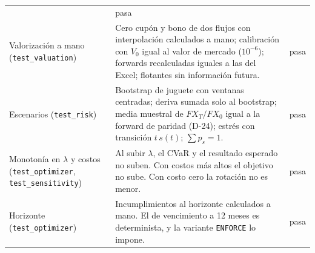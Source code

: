 \begin{table}[htbp]
\begin{tabular}{p{}p{}l}
  & pasa \\
Valorización a mano (\texttt{test\_valuation})
  & Cero cupón y bono de dos flujos con interpolación calculados a mano; calibración con $V_0$ igual al
    valor de mercado ($10^{-6}$); forwards recalculadas iguales a las del Excel; flotantes sin
    información futura.
  & pasa \\
Escenarios (\texttt{test\_risk})
  & Bootstrap de juguete con ventanas centradas; deriva sumada solo al bootstrap; media muestral de
    $FX_T/FX_0$ igual a la forward de paridad (D-24); estrés con transición $t\,s(t)$; $\sum p_s = 1$.
  & pasa \\
Monotonía en $\lambda$ y costos (\texttt{test\_optimizer}, \texttt{test\_sensitivity})
  & Al subir $\lambda$, el CVaR y el resultado esperado no suben. Con costos más altos el objetivo no sube.
    Con costo cero la rotación no es menor.
  & pasa \\
Horizonte (\texttt{test\_optimizer})
  & Incumplimientos al horizonte calculados a mano. El de vencimiento a 12 meses es determinista, y la
    variante \texttt{ENFORCE} lo impone.
  & pasa \\
\bottomrule
\end{tabular}
\end{table}

